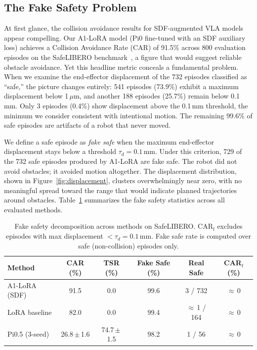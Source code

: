 \subsection{The Fake Safety Problem}\label{sec:fake_safety}

At first glance, the collision avoidance results for SDF-augmented VLA models appear compelling. Our A1-LoRA model (Pi0 fine-tuned with an SDF auxiliary loss) achieves a Collision Avoidance Rate (CAR) of 91.5\% across 800 evaluation episodes on the SafeLIBERO benchmark~\cite{hu2025vlsa}, a figure that would suggest reliable obstacle avoidance. Yet this headline metric conceals a fundamental problem. When we examine the end-effector displacement of the 732 episodes classified as ``safe,'' the picture changes entirely: 541 episodes (73.9\%) exhibit a maximum displacement below 1\,$\mu$m, and another 188 episodes (25.7\%) remain below 0.1\,mm. Only 3 episodes (0.4\%) show displacement above the 0.1\,mm threshold, the minimum we consider consistent with intentional motion. The remaining 99.6\% of safe episodes are artifacts of a robot that never moved.

We define a safe episode as \emph{fake safe} when the maximum end-effector displacement stays below a threshold $\tau_d = 0.1$\,mm. Under this criterion, 729 of the 732 safe episodes produced by A1-LoRA are fake safe. The robot did not avoid obstacles; it avoided motion altogether. The displacement distribution, shown in Figure~\ref{fig:displacement}, clusters overwhelmingly near zero, with no meaningful spread toward the range that would indicate planned trajectories around obstacles. Table~\ref{tab:fake_safety} summarizes the fake safety statistics across all evaluated methods.

\begin{table}[t]
\centering
\caption{Fake safety decomposition across methods on SafeLIBERO. CAR$_\text{f}$ excludes episodes with max displacement $< \tau_d = 0.1$\,mm. Fake safe rate is computed over safe (non-collision) episodes only.}
\label{tab:fake_safety}
\vspace{2pt}
\small
\begin{tabular}{lccccc}
\toprule
Method & CAR (\%) & TSR (\%) & Fake Safe (\%) & Real Safe & CAR$_\text{f}$ (\%) \\
\midrule
A1-LoRA (SDF) & 91.5 & 0.0 & 99.6 & 3 / 732 & $\approx$\,0 \\
LoRA baseline  & 82.0 & 0.0 & 99.4 & $\approx$\,1 / 164 & $\approx$\,0 \\
Pi0.5 (3-seed) & 26.8\,$\pm$\,1.6 & 74.7\,$\pm$\,1.5 & 98.2 & 1 / 56 & $\approx$\,0 \\
\bottomrule
\end{tabular}
\end{table}


